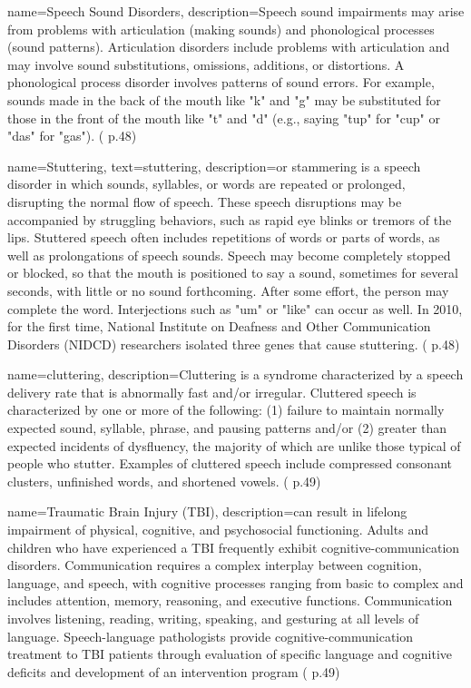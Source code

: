  {
	name={Speech Sound Disorders}, 
	description={Speech sound impairments may arise from problems with articulation (making sounds) and phonological processes (sound patterns). Articulation disorders include problems with articulation and may involve sound substitutions, omissions, additions, or distortions. A phonological process disorder involves patterns of sound errors. For example, sounds made in the back of the mouth like "k" and "g" may be substituted for those in the front of the mouth like "t" and "d" (e.g., saying "tup" for "cup" or "das" for "gas"). (\cite{SLPathologies} p.48)
}
}


 {
	name={Stuttering}, 
	text={stuttering},
	description={or stammering is a speech disorder in which sounds, syllables, or words are repeated or prolonged, disrupting the normal flow of speech. These speech disruptions may be accompanied by struggling behaviors, such as rapid eye blinks or tremors of the lips. Stuttered speech often includes repetitions of words or parts of words, as well as prolongations of speech sounds. Speech may become completely stopped or blocked, so that the mouth is positioned to say a sound, sometimes for several seconds, with little or no sound forthcoming. After some effort, the person may complete the word. Interjections such as "um" or "like" can occur as well. In 2010, for the first time, National Institute on Deafness and Other Communication Disorders (NIDCD) researchers isolated three genes that cause stuttering. (\cite{SLPathologies} p.48)
}
}

 {
	name={cluttering}, 
	description={Cluttering is a syndrome characterized by a speech delivery rate that is abnormally fast and/or irregular. Cluttered speech is characterized by one or more of the following: (1) failure to maintain normally expected sound, syllable, phrase, and pausing patterns and/or (2) greater than expected incidents of dysfluency, the majority of which are unlike those typical of people who stutter. Examples of cluttered speech include compressed consonant clusters, unfinished words, and shortened vowels. (\cite{SLPathologies} p.49)
}
}

 {
	name={Traumatic Brain Injury (TBI)}, 
	description={can result in lifelong impairment of physical, cognitive, and psychosocial functioning. Adults and children who have experienced a TBI frequently exhibit cognitive-communication disorders. Communication requires a complex interplay between cognition, language, and speech, with cognitive processes ranging from basic to complex and includes attention, memory, reasoning, and executive functions. Communication involves listening, reading, writing, speaking, and gesturing at all levels of language. Speech-language pathologists provide cognitive-communication treatment to TBI patients through evaluation of specific language and cognitive deficits and development of an intervention program (\cite{SLPathologies} p.49)
}%
}

